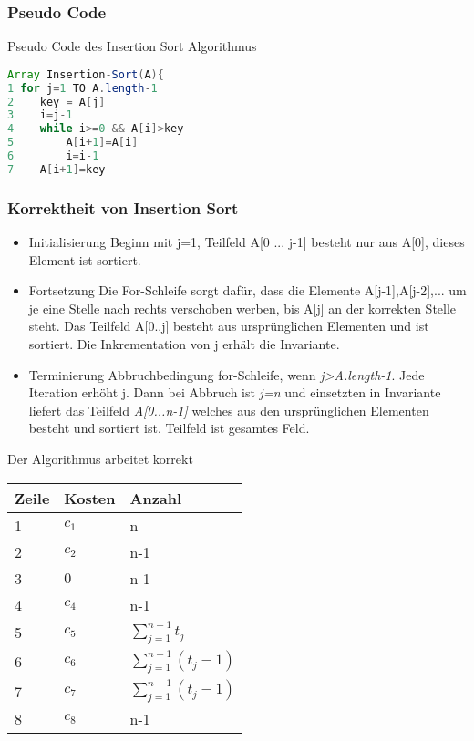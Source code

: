 \documentclass[jou,apacite]{apa6}
\begin{document}
\subsubsection{Pseudo Code}
Pseudo Code des Insertion Sort Algorithmus
{\ttfamily
\begin{lstlisting}[language=Java]
Array Insertion-Sort(A){
1 for j=1 TO A.length-1
2    key = A[j]
3    i=j-1
4    while i>=0 && A[i]>key
5        A[i+1]=A[i]
6        i=i-1
7    A[i+1]=key
\end{lstlisting}}


\subsubsection{Korrektheit von Insertion Sort}
\begin{itemize}
    \item Initialisierung Beginn mit j=1, Teilfeld A[0 ... j-1] besteht nur aus A[0], dieses Element ist sortiert.
    \item Fortsetzung Die For-Schleife sorgt dafür, dass die Elemente A[j-1],A[j-2],... um je eine Stelle nach rechts verschoben werben, bis A[j] an der korrekten Stelle steht. Das Teilfeld A[0..j] besteht aus ursprünglichen Elementen und ist sortiert. Die Inkrementation von j erhält die Invariante.
    \item Terminierung Abbruchbedingung for-Schleife, wenn {\itshape j>A.length-1}. Jede Iteration erhöht j. Dann bei Abbruch ist {\itshape j=n} und einsetzten in Invariante liefert das Teilfeld {\itshape A[0...n-1]} welches aus den ursprünglichen Elementen besteht und sortiert ist. Teilfeld ist gesamtes Feld.
\end{itemize}

Der Algorithmus arbeitet korrekt
\begin{table}[h]
\centering
\begin{tabular}{|l|l|l|}
\hline
Zeile & Kosten & Anzahl  \\
\hline
1     & $c_1$     &  n       \\
2     & $c_2$     &  n-1        \\
3     & $0$       &  n-1        \\
4     & $c_4$     &  n-1        \\
5     & $c_5$     &  $\sum\limits_{j=1}^{n-1}t_j$       \\
6     & $c_6$     &  $\sum\limits_{j=1}^{n-1}(t_j-1)$        \\
7     & $c_7$     &  $\sum\limits_{j=1}^{n-1}(t_j-1)$        \\
8     & $c_8$     &  n-1    \\
\hline
\end{tabular}
\end{table}
\end{document}

